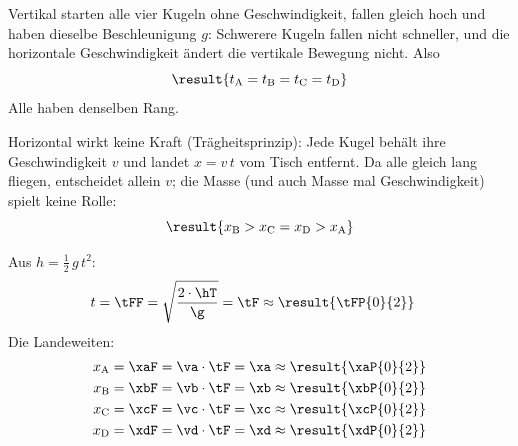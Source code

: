 \begin{abcliste}
\abc
Vertikal starten alle vier Kugeln ohne Geschwindigkeit, fallen gleich hoch und haben dieselbe Beschleunigung $g$: Schwerere Kugeln fallen nicht schneller, und die horizontale Geschwindigkeit ändert die vertikale Bewegung nicht. Also
\[
 \result{t_\mathrm{A} = t_\mathrm{B} = t_\mathrm{C} = t_\mathrm{D}}
\]
Alle haben denselben Rang.

\abc
Horizontal wirkt keine Kraft (Trägheitsprinzip): Jede Kugel behält ihre Geschwindigkeit $v$ und landet $x = v\,t$ vom Tisch entfernt. Da alle gleich lang fliegen, entscheidet allein $v$; die Masse (und auch Masse mal Geschwindigkeit) spielt keine Rolle:
\[
 \result{x_\mathrm{B} > x_\mathrm{C} = x_\mathrm{D} > x_\mathrm{A}}
\]

\abc
Aus $h = \frac12\,g\,t^2$:
\begin{align}
 t &= \tFF = \sqrt{\frac{2\cdot\hT}{\g}} = \tF \approx \result{\tFP{0}{2}}
\end{align}
Die Landeweiten:
\begin{align}
 x_\mathrm{A} &= \xaF = \va\cdot\tF = \xa \approx \result{\xaP{0}{2}} \\
 x_\mathrm{B} &= \xbF = \vb\cdot\tF = \xb \approx \result{\xbP{0}{2}} \\
 x_\mathrm{C} &= \xcF = \vc\cdot\tF = \xc \approx \result{\xcP{0}{2}} \\
 x_\mathrm{D} &= \xdF = \vd\cdot\tF = \xd \approx \result{\xdP{0}{2}}
\end{align}
\end{abcliste}
